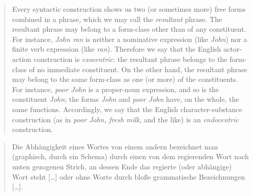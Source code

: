 {    \begin{quote}
    Every syntactic construction shows us two (or sometimes more) free forms combined in a phrase, which we may call the \textit{resultant} phrase. The resultant phrase may belong to a form-class other than of any constituent. For instance, \textit{John ran} is neither a nominative expression (like \textit{John}) nor a finite verb expression (like \textit{ran}). Therefore we say that the English actor-action construction is \textit{exocentric}: the resultant phrase belongs to the form-class of no immediate constituent. On the other hand, the resultant phrase may belong to the same form-class as one (or more) of the constituents. For instance, \textit{poor John} is a proper-noun expression, and so is the constituent \textit{John}; the forms \textit{John} and \textit{poor John} have, on the whole, the same functions. Accordingly, we say that the English character-substance construction (as in \textit{poor John, fresh milk}, and the like) is an \textit{endocentric} construction.\\\hbox{}\hfill\hbox{\citep[section 12.10]{bloomfield1933language}}
    \end{quote}


    \begin{quote}
    Die Abhängigkeit eines Wortes von einem andern bezeichnet man (graphisch, durch ein Schema) durch einen von dem regierenden Wort nach unten gezogenen Strich, an dessen Ende das regierte (oder abhängige) Wort steht […] oder ohne Worte durch bloße grammatische Bezeichnungen […].\hfill\hbox{\citep[10]{kern1883zur}}
    \end{quote}
}

